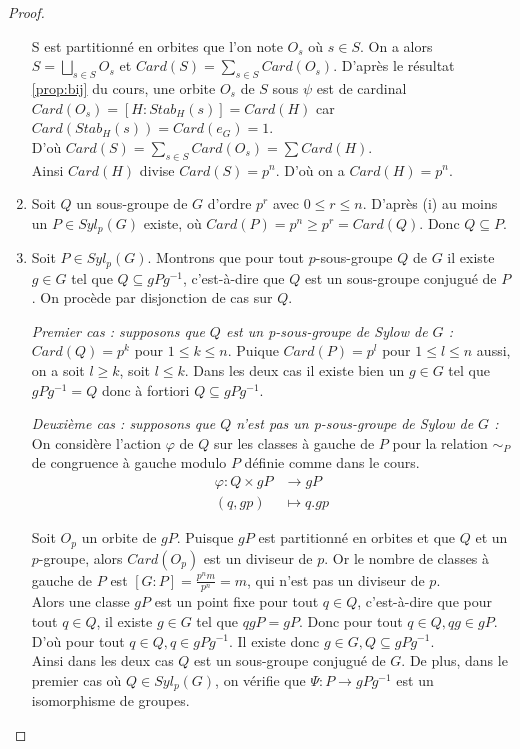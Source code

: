 \documentclass{article}
\theoremstyle{definition}
\theoremstyle{plain}
\theoremstyle{plain}
\theoremstyle{plain}
\theoremstyle{plain}
\theoremstyle{definition}
\theoremstyle{plain}
\theoremstyle{plain}
\begin{document}
\begin{proof}
\begin{enumerate}[label={\upshape(\roman*)}]
S est partitionné en orbites que l'on note \( O_s \) où \( s \in S \). On a alors \( S = \bigsqcup_{s \in S} O_{s} \) et \( Card(S) = \sum_{s \in S} Card(O_{s}) \).
D'après le résultat \ref{prop:bij} du cours, une orbite \( O_s \) de \( S \) sous \( \psi \) est de cardinal \( Card(O_s) = [H : Stab_{H}({s}) ] = Card(H) \) car \( Card(Stab_{H}({s})) = Card(e_{G}) = 1 \). \\
D'où \( Card(S) = \sum_{s \in S} Card(O_{s}) = \sum Card(H) \).\\ 
Ainsi \( Card(H) \) divise \( Card(S) = p^{n} \). D'où on a \( Card(H) = p^{n} \).

\item Soit \( Q \) un sous-groupe de \( G \) d'ordre \( p^{r} \) avec \( 0 \leq r \leq n \). 
D'après (i) au moins un \( P \in Syl_p(G) \) existe, où \( Card(P) = p^{n} \geq p ^{r} = Card(Q) \).
Donc \( Q \subseteq P \).

\item Soit \( P \in Syl_{p}({G}) \). Montrons que pour tout \(p\)-sous-groupe \( Q \) de \( G \) il existe \( g \in G \) tel que \( Q \subseteq gPg^{-1} \), c'est-à-dire que \( Q \) est un sous-groupe conjugué de \( P \). On procède par disjonction de cas sur \( Q \).
	\par \textit{Premier cas : supposons que \( Q \) est un p-sous-groupe de Sylow de \( G \) :}\\
	\( Card(Q) = p^{k}\) pour \( 1 \le k \le n \). Puique \( Card(P) = p^{l}\) pour 
	\( 1 \le l \le n \) aussi, on a soit \( l \ge k \), soit \( l \le k \). Dans les 
	deux cas il existe bien un \( g \in G \) tel que 
	\( gPg^{-1} = Q \) donc à fortiori \( Q \subseteq gPg^{-1} \).
	
	\par \textit{Deuxième cas : supposons que \( Q \) n'est pas un p-sous-groupe de Sylow de \( G \) :}\\ On considère l'action \( \varphi \) de \( Q \) sur les classes à gauche de \( P \) pour la relation \( \sim_{P} \) de congruence à gauche modulo \( P \) définie comme dans le cours. 
\begin{align*}
	\varphi : Q \times gP &\to gP \\
	(q,gp) &\mapsto q.gp
\end{align*}

Soit \( O_{p} \) un orbite de \( gP \). Puisque \( gP \) est partitionné en orbites et que \( Q \) et un \(p\)-groupe, alors \( Card(O_{p}) \) est un diviseur de \( p \). Or le nombre de classes à gauche de \( P \) est \([G : P] = \frac{p^{n}m}{p^{n}} = m  \), qui n'est pas un diviseur de \( p \). \\
Alors une classe \( gP \) est un point fixe pour tout \( q \in Q \), c'est-à-dire que pour tout \( q \in Q \), il existe \( g \in G \) tel que \( qgP = gP \). 
Donc pour tout \( q \in Q, qg \in gP \). 
D'où pour tout \( q \in Q, q \in gPg^{-1} \). Il existe donc \( g \in G, Q \subseteq gPg^{-1} \).\\ 
Ainsi dans les deux cas \( Q \) est un sous-groupe conjugué de \( G \). 
De plus, dans le premier cas où \( Q \in Syl_p(G) \), on vérifie que \( \varPsi : P \rightarrow gPg^{-1} \) est un isomorphisme de groupes.


\end{enumerate}
\end{proof}
\end{document}

